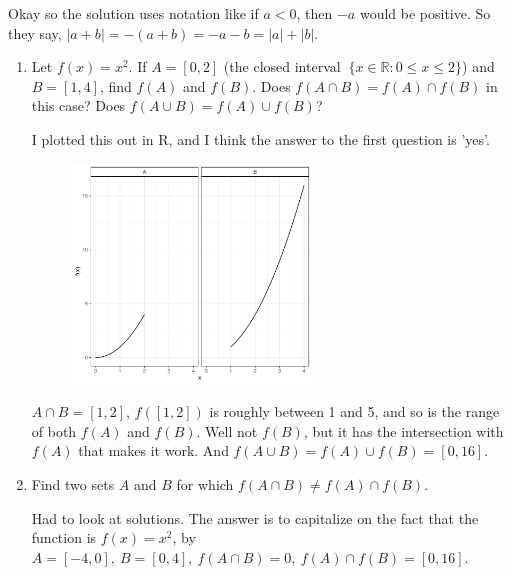 \documentclass{article}
\numberwithin{equation}{subsection}
\numberwithin{theo}{subsection}
\begin{document}
\begin{enumerate}
\begin{enumerate}
                Okay so the solution uses notation like if $a < 0$, then $-a$
                would be positive. So they say, $\lvert a + b \rvert = -(a + b)
                = -a-b = \lvert a \rvert + \lvert b \rvert$.

        \end{enumerate}

        \begin{enumerate}
            \item Let $f(x) = x^2$. If $A = [0, 2]$ (the closed interval $~\{x
                \in \mathbb{R} : 0 \leq x \leq 2 \}$) and $B = [1, 4]$, find
                $f(A)$ and $f(B)$. Does $f(A \cap B) = f(A) \cap f(B)$ in this
                case? Does $f(A \cup B) = f(A) \cup f(B)$? 

            I plotted this out in R, and I think the answer to the first
            question is 'yes'. 

            \begin{figure}[ht!]
                \centering
                \includegraphics[width=2.5in, scale=0.5]{exercise1-2-7.pdf}
            \end{figure}

            $A \cap B = [1,2]$, $f([1,2])$ is roughly between 1 and 5, and so
           is the range of both $f(A)$ and $f(B)$. Well not $f(B)$, but it has
           the intersection with $f(A)$ that makes it work. And $f(A \cup B) =
           f(A) \cup f(B) = [0, 16]$.

       \item Find two sets $A$ and $B$ for which $f(A \cap B) \neq f(A) \cap
           f(B)$.

           Had to look at solutions. The answer is to capitalize on the fact
           that the function is $f(x) = x^2$, by $A = [-4, 0],~B = [0,
           4],~f(A\cap B) = {0},~f(A) \cap f(B) = [0, 16]$.

        \end{enumerate}


\end{enumerate}
\end{document}
